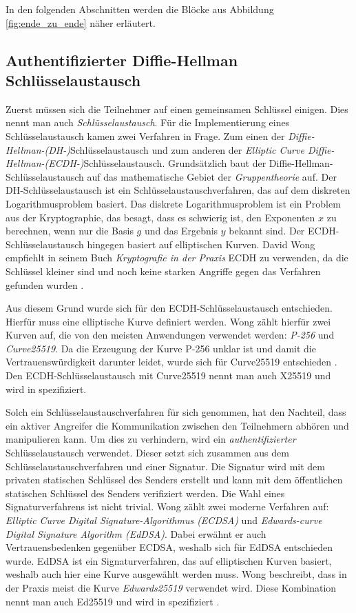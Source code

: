 \noindent In den folgenden Abschnitten werden die Blöcke aus Abbildung \ref{fig:ende_zu_ende} näher erläutert.

\subsection{Authentifizierter Diffie-Hellman Schlüsselaustausch}
\label{subsec:ecdh}

Zuerst müssen sich die Teilnehmer auf einen gemeinsamen Schlüssel einigen. Dies nennt man auch \textit{Schlüsselaustausch}. Für die Implementierung eines Schlüsselaustausch kamen zwei Verfahren in Frage. Zum einen der \textit{Diffie-Hellman-(DH-)}Schlüsselaustausch und zum anderen der \textit{Elliptic Curve Diffie-Hellman-(ECDH-)}Schlüsselaustausch. Grundsätzlich baut der Diffie-Hellman-Schlüsselaustausch auf das mathematische Gebiet der \textit{Gruppentheorie} auf. Der DH-Schlüsselaustausch ist ein Schlüsselaustauschverfahren, das auf dem diskreten Logarithmusproblem basiert. Das diskrete Logarithmusproblem ist ein Problem aus der Kryptographie, das besagt, dass es schwierig ist, den Exponenten $x$ zu berechnen, wenn nur die Basis $g$ und das Ergebnis $y$ bekannt sind. Der ECDH-Schlüsselaustausch hingegen basiert auf elliptischen Kurven. David Wong empfiehlt in seinem Buch \textit{Kryptografie in der Praxis} ECDH zu verwenden, da die Schlüssel kleiner sind und noch keine starken Angriffe gegen das Verfahren gefunden wurden \Parencite[S. 101-125]{Wong_KryptoPraxis}.

Aus diesem Grund wurde sich für den ECDH-Schlüsselaustausch entschieden. Hierfür muss eine elliptische Kurve definiert werden. Wong zählt hierfür zwei Kurven auf, die von den meisten Anwendungen verwendet werden: \textit{P-256} und \textit{Curve25519}. Da die Erzeugung der Kurve P-256 unklar ist und damit die Vertrauenswürdigkeit darunter leidet, wurde sich für Curve25519 entschieden \Parencite[S. 121]{Wong_KryptoPraxis}. Den ECDH-Schlüsselaustausch mit Curve25519 nennt man auch X25519 und wird in \cite{rfc_ietf_curve25519} spezifiziert.

Solch ein Schlüsselaustauschverfahren für sich genommen, hat den Nachteil, dass ein aktiver Angreifer die Kommunikation zwischen den Teilnehmern abhören und manipulieren kann. Um dies zu verhindern, wird ein \textit{authentifizierter} Schlüsselaustausch verwendet. Dieser setzt sich zusammen aus dem Schlüsselaustauschverfahren und einer Signatur. Die Signatur wird mit dem privaten statischen Schlüssel des Senders erstellt und kann mit dem öffentlichen statischen Schlüssel des Senders verifiziert werden. Die Wahl eines Signaturverfahrens ist nicht trivial. Wong zählt zwei moderne Verfahren auf: \textit{Elliptic Curve Digital Signature-Algorithmus (ECDSA)} und \textit{Edwards-curve Digital Signature Algorithm (EdDSA)}. Dabei erwähnt er auch Vertrauensbedenken gegenüber ECDSA, weshalb sich für EdDSA entschieden wurde. EdDSA ist ein Signaturverfahren, das auf elliptischen Kurven basiert, weshalb auch hier eine Kurve ausgewählt werden muss. Wong beschreibt, dass in der Praxis meist die Kurve \textit{Edwards25519} verwendet wird. Diese Kombination nennt man auch Ed25519 und wird in \cite{rfc_EdDSA} spezifiziert \Parencite[S. 160-172]{Wong_KryptoPraxis}.

